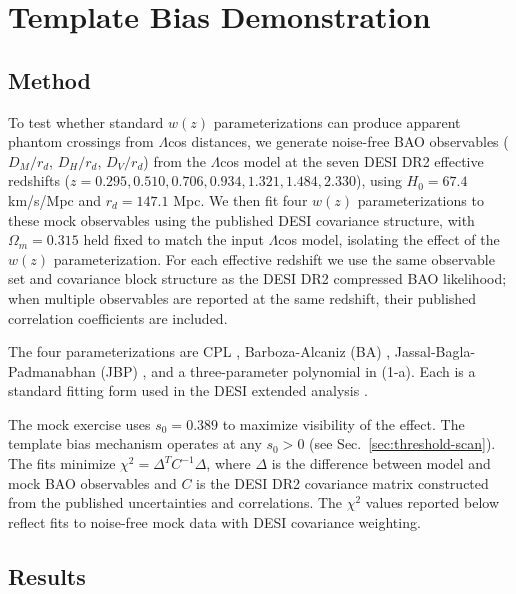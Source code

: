 \documentclass[
  aps,
  prd,
  onecolumn,         %
  nofootinbib,
  longbibliography
]{revtex4-2}
\begin{document}
\section{Template Bias Demonstration}\label{sec:template-bias}

\subsection{Method}\label{sec:tb-method}

To test whether standard $w(z)$ parameterizations can produce apparent
phantom crossings from $\Lambda$cos distances, we generate noise-free BAO
observables ($D_M/r_d$, $D_H/r_d$, $D_V/r_d$) from the $\Lambda$cos model at the
seven DESI DR2 effective redshifts ($z = 0.295, 0.510, 0.706, 0.934,
1.321, 1.484, 2.330$), using $H_0 = 67.4$ km/s/Mpc and $r_d = 147.1$ Mpc. We
then fit four $w(z)$ parameterizations to these mock observables using the
published DESI covariance structure, with $\Omega_m = 0.315$ held fixed to
match the input $\Lambda$cos model, isolating the effect of the $w(z)$
parameterization. For each effective redshift we use the same observable
set and covariance block structure as the DESI DR2 compressed BAO
likelihood; when multiple observables are reported at the same redshift,
their published correlation coefficients are included.

The four parameterizations are CPL \cite{ref4,ref5}, Barboza-Alcaniz (BA)
\cite{ref10}, Jassal-Bagla-Padmanabhan (JBP) \cite{ref11}, and a three-parameter
polynomial in (1-a). Each is a standard fitting form used in the DESI
extended analysis \cite{ref9}.

The mock exercise uses $s_0 = 0.389$ to maximize visibility of the effect.
The template bias mechanism operates at any $s_0 > 0$ (see
Sec.~\ref{sec:threshold-scan}). The fits minimize $\chi^2 = \Delta^T C^{-1}\Delta$, where $\Delta$ is the difference between
model and mock BAO observables and $C$ is the DESI DR2 covariance matrix
constructed from the published uncertainties and correlations. The $\chi^2$
values reported below reflect fits to noise-free mock data with DESI
covariance weighting.

\subsection{Results}\label{sec:tb-results}
\end{document}
